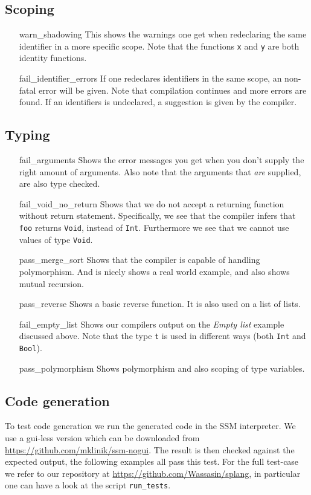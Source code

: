 \documentclass[14pt]{amsart}
\begin{document}
\subsection{Scoping}
\begin{itemize}
	\item[warn\_shadowing] This shows the warnings one get when redeclaring the same identifier in a more specific scope. Note that the functions \texttt{x} and \texttt{y} are both identity functions.
	\item[fail\_identifier\_errors] If one redeclares identifiers in the same scope, an non-fatal error will be given. Note that compilation continues and more errors are found. If an identifiers is undeclared, a suggestion is given by the compiler.
\end{itemize}
\subsection{Typing}
\begin{itemize}
	\item[fail\_arguments] Shows the error messages you get when you don't supply the right amount of arguments. Also note that the arguments that \emph{are} supplied, are also type checked.
	\item[fail\_void\_no\_return] Shows that we do not accept a returning function without return statement. Specifically, we see that the compiler infers that \texttt{foo} returns \texttt{Void}, instead of \texttt{Int}. Furthermore we see that we cannot use values of type \texttt{Void}.
	\item[pass\_merge\_sort] Shows that the compiler is capable of handling polymorphism. And is nicely shows a real world example, and also shows mutual recursion.
	\item[pass\_reverse] Shows a basic reverse function. It is also used on a list of lists.
	\item[fail\_empty\_list] Shows our compilers output on the \emph{Empty list} example discussed above. Note that the type \texttt{t} is used in different ways (both \texttt{Int} and \texttt{Bool}).
	\item[pass\_polymorphism] Shows polymorphism and also scoping of type variables.
\end{itemize}

\subsection{Code generation}
To test code generation we run the generated code in the SSM interpreter. We use a gui-less version which can be downloaded from \url{https://github.com/mklinik/ssm-nogui}. The result is then checked against the expected output, the following examples all pass this test. For the full test-case we refer to our repository at \url{https://github.com/Wassasin/splang}, in particular one can have a look at the script \texttt{run\_tests}.
\end{document}
